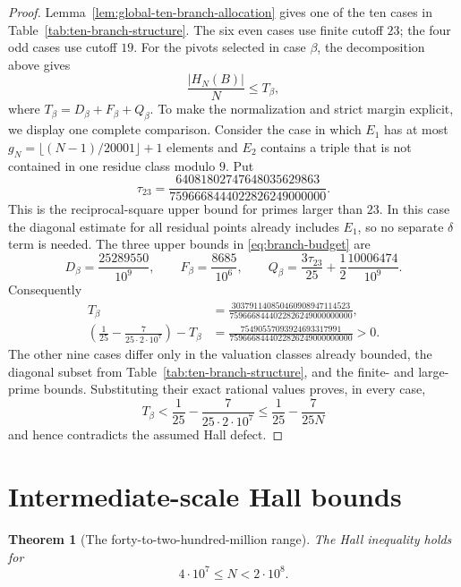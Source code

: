 \documentclass[11pt]{article}
\newtheorem{theorem}{Theorem}[section]
\theoremstyle{definition}
\newcommand{\TwentyMillion}{2\cdot10^7}
\newcommand{\FortyMillion}{4\cdot10^7}
\newcommand{\TwoHundredMillion}{2\cdot10^8}
\begin{document}
\begin{proof}
 Lemma~\ref{lem:global-ten-branch-allocation} gives one of the ten cases in
 Table~\ref{tab:ten-branch-structure}.
 The six even cases use finite cutoff $23$; the four odd cases use cutoff $19$.
 For the pivots selected in case $\beta$, the decomposition above gives
\[
 \frac{|H_N(B)|}{N}\leq T_\beta,
\]
where $T_\beta=D_\beta+F_\beta+Q_\beta$.  To make the normalization and strict
margin explicit, we display one complete comparison.  Consider the case in
which $E_1$ has at most
 $g_N=\lfloor(N-1)/20001\rfloor+1$ elements and $E_2$ contains a triple that
is not contained in one residue class modulo $9$.  Put
\[
 \tau_{23}=
 \frac{64081802747648035629863}
 {7596668444022826249000000}.
\]
 This is the reciprocal-square upper bound for primes larger than $23$.  In
 this case the diagonal estimate for all residual points already includes
 $E_1$, so no separate $\delta$ term is needed.  The three upper bounds
in \eqref{eq:branch-budget} are
\[
 D_\beta=\frac{25289550}{10^9},\qquad
 F_\beta=\frac{8685}{10^6},\qquad
 Q_\beta=\frac{3\tau_{23}}{25}
          +\frac12\frac{10006474}{10^9}.
\]
Consequently
\begin{align*}
 T_\beta
 &=\frac{303791140850460908947114523}
 {7596668444022826249000000000},\\
 \left(\frac1{25}-\frac7{25\cdot\TwentyMillion}\right)-T_\beta
 &=\frac{75490557093924693317991}
 {7596668444022826249000000000}>0.
\end{align*}
 The other nine cases differ only in the valuation classes already bounded, the
diagonal subset from Table~\ref{tab:ten-branch-structure}, and the finite- and
large-prime bounds.  Substituting their exact rational values proves, in every
case,
\[
 T_\beta<\frac1{25}-\frac7{25\cdot\TwentyMillion}
 \leq\frac1{25}-\frac7{25N}
\]
and hence contradicts the assumed Hall defect.
\end{proof}

\section{Intermediate-scale Hall bounds}

\begin{theorem}[The forty-to-two-hundred-million range]
\label{thm:mixed-joint-tail-close}
The Hall inequality holds for
\[
 \FortyMillion\leq N<\TwoHundredMillion.
\]
\end{theorem}
\end{document}
